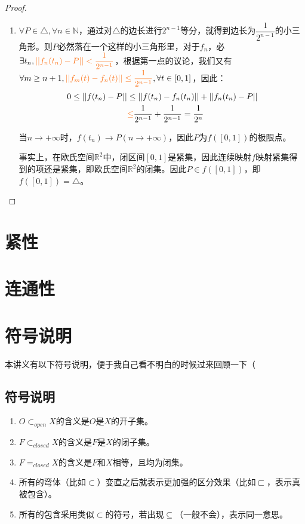 \documentclass[lang=cn,10pt,device=pad]{elegantbook}
\newcommand{\tl}[1]{\textcolor{myor}{#1}}
\begin{document}
\begin{example}[Peano曲线]
\begin{proof}
\begin{enumerate}
			\item $\forall P	\in \triangle ,\forall n\in \mathbb{N}$，通过对$\triangle$的边长进行$2^{n-1}$等分，就得到边长为$\dfrac{1}{2^{n-1}}$的小三角形。则$P$必然落在一个这样的小三角形里，对于$f_n$，必$\exists t_{n},\tl{||f_{n}(t_{n})-P||<\dfrac{1}{2^{n-1}}}$，根据第一点的议论，我们又有$\forall m\geq n+1, \tl{||f_{m}(t) - f_{n}(t)||\leq \dfrac{1}{2^{n-1}}} , \forall t\in [0,1]$，因此：
			\begin{equation*}
				\begin{aligned}
					0\leq ||f(t_{n})-P||&\leq ||f(t_{n})-f_{n}(t_{n})||+||f_{n}(t_{n})-P||\\
					 &\tl{\leq} \dfrac{1}{2^{n-1}}+\dfrac{1}{2^{n-1}} = \dfrac{1}{2^{n}}
				\end{aligned}
			\end{equation*}
			
			当$n\to +\infty$时，$f(t_{n}) \rightarrow P(n\to +\infty)$，因此$P$为$f([0,1])$的极限点。
			
			事实上，\textcolor{myblu}{在欧氏空间$\mathbb{R}^{2}$中，闭区间$[0,1]$是紧集，因此连续映射$f$映射紧集得到的项还是紧集，即欧氏空间$\mathbb{R}^{2}$的闭集。}因此$P\in f([0,1])$，即$f([0,1]) = \triangle$。
		\end{enumerate}
	\end{proof}
\end{example}

\chapter{紧性}
\chapter{连通性}
\chapter{符号说明}
%	

本讲义有以下符号说明，便于我自己看不明白的时候过来回顾一下（
\section{符号说明}
\begin{enumerate}
	\item $O\subset_{open}X$的含义是$O$是$X$的开子集。
	\item $F\subset_{closed}X$的含义是$F$是$X$的闭子集。
	\item $F=_{closed}X$的含义是$F$和$X$相等，且均为闭集。
	\item 所有的弯体（比如$\subset$）变直之后就表示更加强的区分效果（比如$\sqsubset$，表示真被包含）。
	\item 所有的包含采用类似$\subset$的符号，若出现$\subseteq$（一般不会），表示同一意思。
\end{enumerate}
\end{document}
